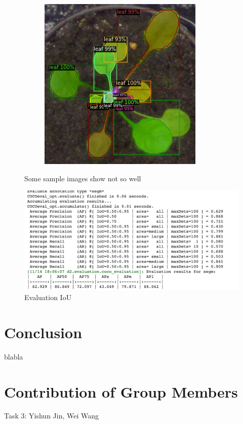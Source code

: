 \documentclass[conference]{IEEEtran}
\begin{document}
\begin{figure}[h!]
\begin{subfigure}[h!]{0.24\textwidth}
\end{subfigure}
\hfill
\begin{subfigure}[h!]{0.4\textwidth}
    \centering
    \includegraphics[width=\textwidth]{img/ara2013_plant162.png}
\end{subfigure}
\caption{Some sample images show not so well}
\label{fig:bad_result}
\end{figure}

\begin{figure}[h!]
    \centering
    \includegraphics[width=\linewidth]{img/iou_evl.png}
    \caption{Evaluation IoU}
    \label{fig_ap}
\end{figure}


\section{Conclusion}

blabla

\section{Contribution of Group Members}


Task 3:  Yishun Jin, Wei Wang




\end{document}
